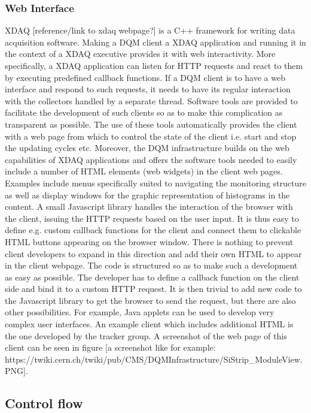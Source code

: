\documentclass[a4paper]{cmspaper}
\begin{document}
\subsubsection{Web Interface}
XDAQ [reference/link to xdaq webpage?] is a C++ framework for writing data acquisition software. Making a DQM client a XDAQ application and running it in the context of a XDAQ executive provides it with web interactivity. More specifically, a XDAQ application can listen for HTTP requests and react to them by executing predefined callback functions. If a DQM client is to have a web interface and respond to such requests, it needs to have its regular interaction with the collectors handled by a separate thread. Software tools are provided to facilitate the development of such clients so as to make this complication as transparent as possible. The use of these tools automatically provides the client with a web page from which to control the state of the client i.e. start and stop the updating cycles etc.
%
Moreover, the DQM infrastructure builds on the web capabilities of XDAQ applications and offers the software tools needed to easily include a number of HTML elements (web widgets) in the client web pages. Examples include menus specifically suited to navigating the monitoring structure as well as display windows for the graphic representation of histograms in the content. A small Javascript library handles the interaction of the browser with the client, issuing the HTTP requests based on the user input. It is thus easy to define e.g. custom callback functions for the client and connect them to clickable HTML buttons appearing on the browser window. 
%
There is nothing to prevent client developers to expand in this direction and add their own HTML to appear in the client webpage. The code is structured so as to make such a development as easy as possible. The developer has to define a callback function on the client side and bind it to a custom HTTP request. It is then trivial to add new code to the Javascript library to get the browser to send the request, but there are also other possibilities. For example, Java applets can be used to develop very complex user interfaces. An example client which includes additional HTML is the one developed by the tracker group. A screenshot of the web page of this client can be seen in figure [a screenshot like for example: https://twiki.cern.ch/twiki/pub/CMS/DQMInfrastructure/SiStrip_ModuleView.PNG].

\subsection{Control flow}
\end{document}
